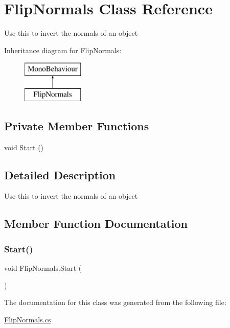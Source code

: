 \hypertarget{class_flip_normals}{}\section{Flip\+Normals Class Reference}
\label{class_flip_normals}


Use this to invert the normals of an object  


Inheritance diagram for Flip\+Normals\+:\begin{figure}[H]
\begin{center}
\leavevmode
\includegraphics[height=2.000000cm]{class_flip_normals}
\end{center}
\end{figure}
\subsection*{Private Member Functions}
\begin{DoxyCompactItemize}
\item 
void \mbox{\hyperlink{class_flip_normals_ae09540466ec32870d991d67ec5424ec3}{Start}} ()
\end{DoxyCompactItemize}


\subsection{Detailed Description}
Use this to invert the normals of an object 



\subsection{Member Function Documentation}
\mbox{\label{class_flip_normals_ae09540466ec32870d991d67ec5424ec3}} 
\subsubsection{\texorpdfstring{Start()}{Start()}}
{\footnotesize\ttfamily void Flip\+Normals.\+Start (\begin{DoxyParamCaption}{ }\end{DoxyParamCaption})\hspace{0.3cm}{\ttfamily [private]}}



The documentation for this class was generated from the following file\+:\begin{DoxyCompactItemize}
\item 
\mbox{\hyperlink{_flip_normals_8cs}{Flip\+Normals.\+cs}}\end{DoxyCompactItemize}
